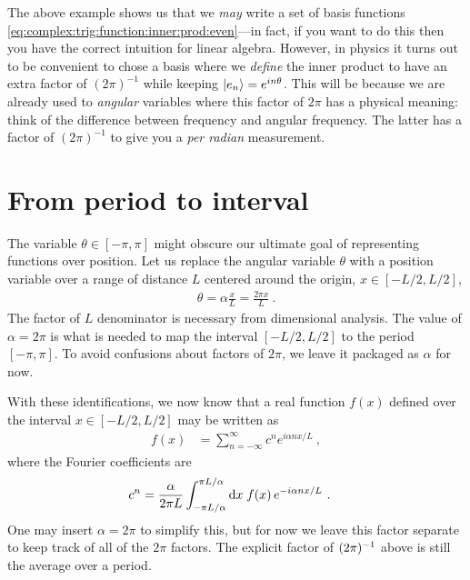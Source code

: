 \documentclass[12pt, oneside]{report}    %
\let\oldsection\section
\def\section{%
  \setcounter{sidenote}{1}%
  \oldsection
}
\begin{document}
The above example shows us that we \emph{may} write a set of basis functions \eqref{eq:complex:trig:function:inner:prod:even}---in fact, if you want to do this then you have the correct intuition for linear algebra. However, in physics it turns out to be convenient to chose a basis where we \emph{define} the inner product to have an extra factor of $(2\pi)^{-1}$ while keeping $\left|e_n\right\rangle = e^{in\theta}$. This will be because we are already used to \emph{angular} variables where this factor of $2\pi$ has a physical meaning: think of the difference between frequency and angular frequency. The latter has a factor of $(2\pi)^{-1}$ to give you  a \emph{per radian} measurement.





\section{From period to interval}

The variable $\theta \in [-\pi, \pi]$ might obscure our ultimate goal of representing functions over position. Let us replace the angular variable $\theta$ with a position variable over a range of distance $L$ centered around the origin, $x \in [-{L}/{2},L/2]$,
\begin{align}
    \theta = \alpha \frac{x}{L} = \frac{2\pi x}{L} \ .
\end{align}
The factor of $L$ denominator is necessary from dimensional analysis. The value of $\alpha = 2\pi$ is what is needed to map the interval $[-L/2,L/2]$ to the period $[-\pi,\pi]$. To avoid confusions about factors of $2\pi$, we leave it packaged as $\alpha$ for now. 

With these identifications, we now know that a real {function} $f(x)$ defined over the interval $x\in[-L/2,L/2]$ may be written as
\begin{align}
    f(x) &= \sum_{n=-\infty}^\infty c^n e^{i\alpha n x/L} \ ,
    \label{eq:fourier:interval:complex}
\end{align}
where the Fourier coefficients are
\begin{align}
    c^n &= \frac{\alpha}{2\pi L} \int_{-\pi L/\alpha}^{\pi L/\alpha} \operatorname{d}\!{x}\; f(x)\, e^{-i\alpha n x/L} \ .
    \label{eq:fourier:interval:complex:coefficient}
\end{align}
One may insert $\alpha = 2\pi$ to simplify this, but for now we leave this factor separate to keep track of all of the $2\pi$ factors. The explicit factor of $(2\pi)^{-1}$ above is still the average over a period.
\end{document}
